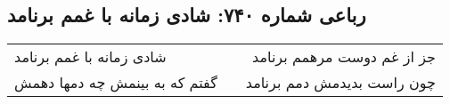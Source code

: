 \begin{center}
\section*{رباعی شماره ۷۴۰: شادی زمانه با غمم برنامد}
\label{sec:0740}
\begin{longtable}{l p{0.5cm} r}
شادی زمانه با غمم برنامد
&&
جز از غم دوست مرهمم برنامد
\\
گفتم که به بینمش چه دمها دهمش
&&
چون راست بدیدمش دمم برنامد
\\
\end{longtable}
\end{center}
